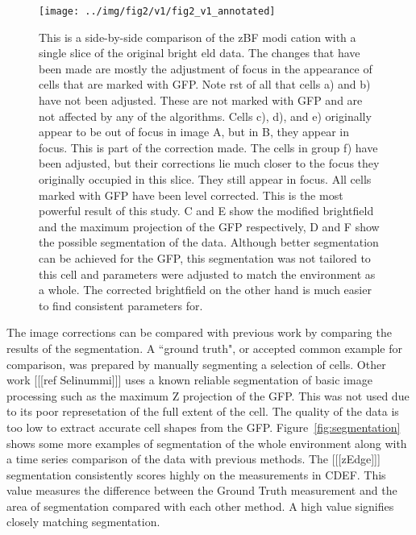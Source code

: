 \documentclass[preprint,11pt,5p,twocolumn]{elsarticle}
\begin{document}
\begin{figure*}
\centering\texttt{[image: ../img/fig2/v1/fig2\_v1\_annotated]}
\label{fig:zbf}
\caption{This is a side-by-side comparison of the zBF modi cation with a single slice of the original bright eld data. The changes that have been made are mostly the adjustment of focus in the appearance of cells that are marked with GFP. Note  rst of all that cells a) and b) have not been adjusted. These are not marked with GFP and are not affected by any of the algorithms. Cells c), d), and e) originally appear to be out of focus in image A, but in B, they appear in focus. This is part of the correction made. The cells in group f) have been adjusted, but their corrections lie much closer to the focus they originally occupied in this slice. They still appear in focus. All cells marked with GFP have been level corrected. This is the most powerful result of this study. C and E show the modified brightfield and the maximum projection of the GFP respectively, D and F show the possible segmentation of the data. Although better segmentation can be achieved for the GFP, this segmentation was not tailored to this cell and parameters were adjusted to match the environment as a whole. The corrected brightfield on the other hand is much easier to find consistent parameters for.}
\end{figure*}

The image corrections can be compared with previous work by comparing the results of the segmentation. A ``ground truth", or accepted common example for comparison, was prepared by manually segmenting a selection of cells. Other work [[[ref Selinummi]]] uses a known reliable segmentation of basic image processing such as the maximum Z projection of the GFP. This was not used due to its poor represetation of the full extent of the cell. The quality of the data is too low to extract accurate cell shapes from the GFP. Figure~\ref{fig:segmentation} shows some more examples of segmentation of the whole environment along with a time series comparison of the data with previous methods. The [[[zEdge]]] segmentation consistently scores highly on the measurements in CDEF. This value measures the difference between the Ground Truth measurement and the area of segmentation compared with each other method. A high value signifies closely matching segmentation.
\end{document}
